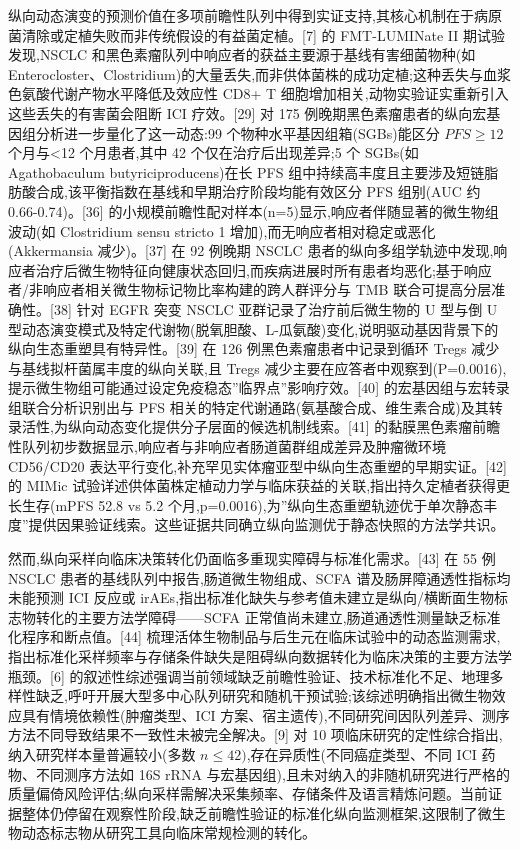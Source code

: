 \documentclass[11pt]{article}
\begin{document}
纵向动态演变的预测价值在多项前瞻性队列中得到实证支持,其核心机制在于病原菌清除或定植失败而非传统假设的有益菌定植。{[}7{]} 的 FMT-LUMINate II 期试验发现,NSCLC 和黑色素瘤队列中响应者的获益主要源于基线有害细菌物种(如 Enterocloster、Clostridium)的大量丢失,而非供体菌株的成功定植;这种丢失与血浆色氨酸代谢产物水平降低及效应性 CD8+ T 细胞增加相关,动物实验证实重新引入这些丢失的有害菌会阻断 ICI 疗效。{[}29{]} 对 175 例晚期黑色素瘤患者的纵向宏基因组分析进一步量化了这一动态:99 个物种水平基因组箱(SGBs)能区分 \(PFS\geq12\) 个月与\textless12 个月患者,其中 42 个仅在治疗后出现差异;5 个 SGBs(如 Agathobaculum butyriciproducens)在长 PFS 组中持续高丰度且主要涉及短链脂肪酸合成,该平衡指数在基线和早期治疗阶段均能有效区分 PFS 组别(AUC 约 0.66-0.74)。{[}36{]} 的小规模前瞻性配对样本(n=5)显示,响应者伴随显著的微生物组波动(如 Clostridium sensu stricto 1 增加),而无响应者相对稳定或恶化(Akkermansia 减少)。{[}37{]} 在 92 例晚期 NSCLC 患者的纵向多组学轨迹中发现,响应者治疗后微生物特征向健康状态回归,而疾病进展时所有患者均恶化;基于响应者/非响应者相关微生物标记物比率构建的跨人群评分与 TMB 联合可提高分层准确性。{[}38{]} 针对 EGFR 突变 NSCLC 亚群记录了治疗前后微生物的 U 型与倒 U 型动态演变模式及特定代谢物(脱氧胆酸、L-瓜氨酸)变化,说明驱动基因背景下的纵向生态重塑具有特异性。{[}39{]} 在 126 例黑色素瘤患者中记录到循环 Tregs 减少与基线拟杆菌属丰度的纵向关联,且 Tregs 减少主要在应答者中观察到(P=0.0016),提示微生物组可能通过设定免疫稳态''临界点''影响疗效。{[}40{]} 的宏基因组与宏转录组联合分析识别出与 PFS 相关的特定代谢通路(氨基酸合成、维生素合成)及其转录活性,为纵向动态变化提供分子层面的候选机制线索。{[}41{]} 的黏膜黑色素瘤前瞻性队列初步数据显示,响应者与非响应者肠道菌群组成差异及肿瘤微环境 CD56/CD20 表达平行变化,补充罕见实体瘤亚型中纵向生态重塑的早期实证。{[}42{]} 的 MIMic 试验详述供体菌株定植动力学与临床获益的关联,指出持久定植者获得更长生存(mPFS 52.8 vs 5.2 个月,p=0.0016),为''纵向生态重塑轨迹优于单次静态丰度''提供因果验证线索。这些证据共同确立纵向监测优于静态快照的方法学共识。

然而,纵向采样向临床决策转化仍面临多重现实障碍与标准化需求。{[}43{]} 在 55 例 NSCLC 患者的基线队列中报告,肠道微生物组成、SCFA 谱及肠屏障通透性指标均未能预测 ICI 反应或 irAEs,指出标准化缺失与参考值未建立是纵向/横断面生物标志物转化的主要方法学障碍------SCFA 正常值尚未建立,肠道通透性测量缺乏标准化程序和断点值。{[}44{]} 梳理活体生物制品与后生元在临床试验中的动态监测需求,指出标准化采样频率与存储条件缺失是阻碍纵向数据转化为临床决策的主要方法学瓶颈。{[}6{]} 的叙述性综述强调当前领域缺乏前瞻性验证、技术标准化不足、地理多样性缺乏,呼吁开展大型多中心队列研究和随机干预试验;该综述明确指出微生物效应具有情境依赖性(肿瘤类型、ICI 方案、宿主遗传),不同研究间因队列差异、测序方法不同导致结果不一致性未被完全解决。{[}9{]} 对 10 项临床研究的定性综合指出,纳入研究样本量普遍较小(多数 \(n\leq42)\),存在异质性(不同癌症类型、不同 ICI 药物、不同测序方法如 16S rRNA 与宏基因组),且未对纳入的非随机研究进行严格的质量偏倚风险评估;纵向采样需解决采集频率、存储条件及语言精炼问题。当前证据整体仍停留在观察性阶段,缺乏前瞻性验证的标准化纵向监测框架,这限制了微生物动态标志物从研究工具向临床常规检测的转化。
\end{document}
